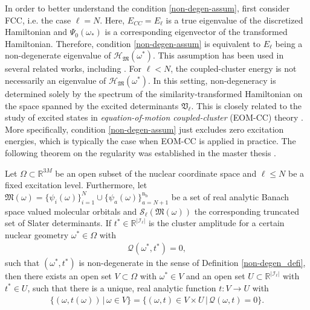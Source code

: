 \documentclass[reqno]{amsart}
\begin{document}
In order to better understand the condition \eqref{non-degen-assum}, first consider FCC, i.e. the case $\ell = N$. Here, $E_{CC}=E_\ell$ is a true eigenvalue of the discretized Hamiltonian and $\Psi_0(\omega_*)$ is a corresponding eigenvector of the transformed Hamiltonian. Therefore, condition \eqref{non-degen-assum} is equivalent to $E_\ell$ being a non-degenerate eigenvalue of $\mathcal{H}_{\mathfrak{M}}(\omega^*)$. This assumption has been used in several related works, including \cite{hassan2025analysissinglereferencecoupled,Csirik_part2}. For $\ell < N$, the coupled-cluster energy is not necessarily an eigenvalue of $\mathcal{H}_{\mathfrak M}(\omega^*)$. In this setting, non-degeneracy is determined solely by the spectrum of the similarity-transformed Hamiltonian on the space spanned by the excited determinants $\mathfrak{V}_\ell$. This is closely related to the study of excited states in \textit{equation-of-motion coupled-cluster} (EOM-CC) theory \cite{Shavitt_Bartlett_2009}. More specifically, condition \eqref{non-degen-assum} just excludes  zero excitation energies, which is typically the case when EOM-CC is applied in practice. The following theorem on the regularity was established in the master thesis \cite{beck2025interpolation}.
\begin{theorem}\label{analytic_amplitudes}

    Let $\Omega\subset \mathbb{R}^{3M}$ be an open subset of the nuclear coordinate space and $\ell\le N$ be a fixed excitation level. Furthermore, let  $\mathfrak{M}(\omega)= \lbrace \psi_i(\omega)\rbrace_{i=1}^N\cup \lbrace \psi_a(\omega)\rbrace_{a=N+1}^{\mathrm{n}_\mathrm{b}}$ be a set of real analytic Banach space valued molecular orbitals and $\mathcal{S}_\ell(\mathfrak{M}(\omega))$ the corresponding truncated set of Slater determinants. If $t^* \in \mathbb{R}^{|\mathscr{I}_\ell|}$ is the cluster amplitude for a certain nuclear geometry $\omega^*\in \Omega $ with 
    \begin{align}
        \mathcal{Q}(\omega^*,t^*)=0,
    \end{align}
    such that $(\omega^*,t^*)$ is non-degenerate in the sense of Definition  \ref{non-degen_defi}, then there exists an open set $V\subset \Omega$ with $\omega^* \in V$ and an open set $U \subset \mathbb{R}^{|\mathscr{I}_\ell|}$ with $t^*\in U$, such that there is a unique, real analytic function $t:V\longrightarrow U$ with 
    \begin{align}
        \big\lbrace (\omega,t(\omega)) \,|\,  \omega\in V\big\rbrace=\big\lbrace  (\omega,t)\in V\times U \,|\,  \mathcal{Q}(\omega,t)=0\big\rbrace.
    \end{align}
\end{theorem}
\end{document}
